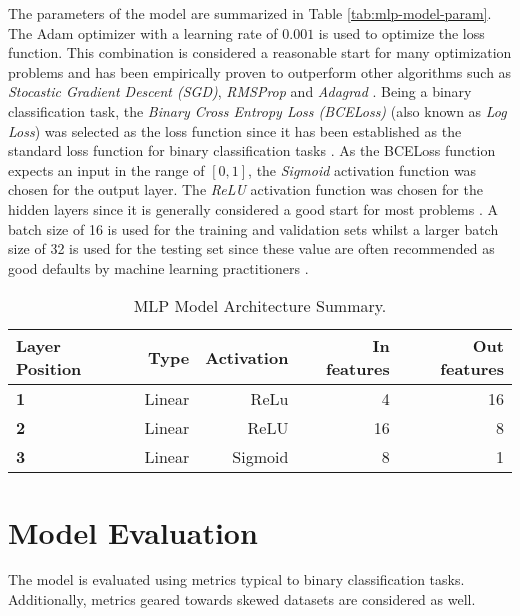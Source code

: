The parameters of the model are summarized in Table
\ref{tab:mlp-model-param}. The Adam optimizer with a learning rate of
$0.001$ is used to optimize the loss function. This combination is
considered a reasonable start for many optimization problems and has
been empirically proven to outperform other algorithms such as
\textit{Stocastic Gradient Descent (SGD)}, \textit{RMSProp} and
\textit{Adagrad} \cite{ruder2016overview}. Being a binary
classification task, the \textit{Binary Cross Entropy Loss (BCELoss)}
(also known as \textit{Log Loss}) was selected as the loss function
since it has been established as the standard loss function for binary
classification tasks \cite{painsky2018universality}. As the BCELoss
function expects an input in the range of $[0, 1]$, the
\textit{Sigmoid} activation function was chosen for the output layer.
The \textit{ReLU} activation function was chosen for the hidden layers
since it is generally considered a good start for most problems
\cite{nwankpa2018activation, wang2019learning}. A batch size of 16 is
used for the training and validation sets whilst a larger batch size
of 32 is used for the testing set since these value are often
recommended as good defaults by machine learning practitioners
\cite{bengio2012practical, goodfellow2016deep}.

\begin{table}[htb]
  \centering
  \caption{MLP Model Architecture Summary.}
  \begin{tabular}{lrrrr}
    \hline
    Layer Position & Type & Activation & In features & Out features \\
    \hline
    \textbf{1} & Linear & ReLu & 4 & 16 \\
    \textbf{2} & Linear & ReLU & 16 & 8 \\
    \textbf{3} & Linear & Sigmoid & 8 & 1 \\
    \hline
  \end{tabular}
  \label{tab:mlp-model-arch}
\end{table}

\section{Model Evaluation}
\label{sec:mlp-model-eval}

The model is evaluated using metrics typical to binary classification
tasks. Additionally, metrics geared towards skewed datasets are
considered as well.

